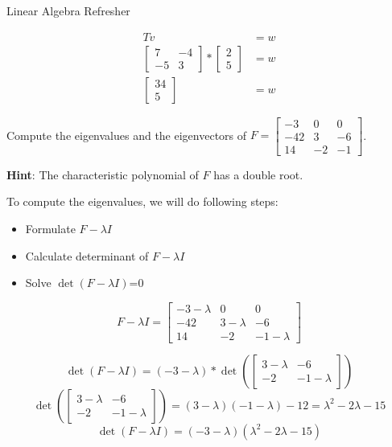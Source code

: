 \documentclass[
	english,
        solution=true
	]{tudaexercise}
\begin{document}
\begin{task}[points=28]{Linear Algebra Refresher}
\begin{subtask}[points=5,title=Basis Transformation ]
\begin{solution}
\begin{align*}
    Tv&=w\\
    \begin{bmatrix}
    7 & -4 \\ -5 & 3
\end{bmatrix}*\begin{bmatrix}
    2 \\ 5
\end{bmatrix}&=w\\
\begin{bmatrix}
    34 \\ 5
\end{bmatrix}&=w
\end{align*}


\end{solution}
\end{subtask}


\newpage

\begin{subtask} [points=5,title=Matrix Decomposition]

Compute the eigenvalues and the eigenvectors of 
$F = 
\begin{bmatrix}
    -3  & 0  & 0  \\
    -42 & 3  & -6 \\
    14  & -2 & -1
\end{bmatrix}$.

\textbf{Hint}: The characteristic polynomial of $F$ has a double root.

\begin{solution}
To compute the eigenvalues, we will do following steps:
\begin{itemize}
    \item Formulate $F-\lambda I$
    \item Calculate determinant of $F-\lambda I$
    \item Solve $\det(F-\lambda I)$=0
\end{itemize}

\[
    F-\lambda I=\begin{bmatrix}
        -3-\lambda & 0 & 0 \\ -42 & 3-\lambda & -6 \\ 14 & -2 & -1-\lambda
    \end{bmatrix}\]
    
    \[\det(F-\lambda I)=(-3-\lambda)*\det(\begin{bmatrix}
        3-\lambda & -6 \\ -2 & -1-\lambda
    \end{bmatrix})\]
    \[\det(\begin{bmatrix}
        3-\lambda & -6 \\ -2 & -1-\lambda
    \end{bmatrix})=(3-\lambda)(-1-\lambda)-12=\lambda^2-2\lambda-15\]
    \[\det(F-\lambda I)=(-3-\lambda)(\lambda^2-2\lambda-15)\]


\end{solution}
\end{subtask}
\end{task}
\end{document}
